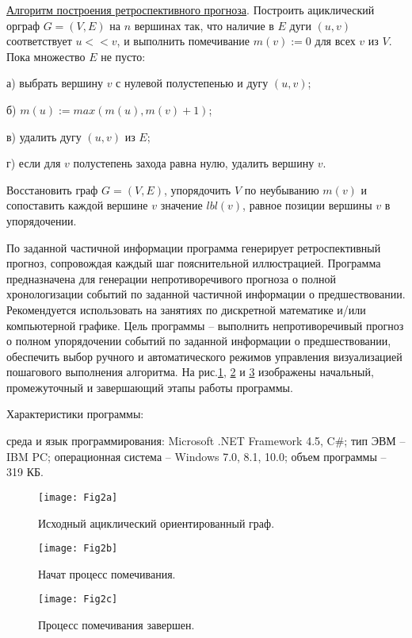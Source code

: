\underline{Алгоритм построения ретроспективного прогноза}. Построить ациклический орграф $G=(V,E)$ на $n$ вершинах так, что наличие в $E$ дуги $(u,v)$ соответствует $u<<v$, и выполнить помечивание $m(v):=0$ для всех $v$ из $V$. Пока множество
 $E$ не пусто:

а) выбрать вершину $v$ с нулевой полустепенью и дугу $(u,v)$;

б) $m(u):=max (m(u), m(v)+1)$;

в) удалить дугу $(u,v)$ из $E$;

г) если для $v$ полустепень захода равна нулю, удалить вершину $v$.

Восстановить граф $G=(V,E)$, упорядочить $V$ по неубыванию $m(v)$ и сопоставить каждой вершине $v$ значение $lbl(v)$, равное позиции вершины $v$ в упорядочении.

По заданной частичной информации программа генерирует ретроспективный прогноз, сопровождая каждый шаг пояснительной иллюстрацией.
Программа \cite{akm-prog2} предназначена для генерации непротиворечивого прогноза о полной хронологизации событий по заданной частичной информации о предшествовании. Рекомендуется использовать на занятиях по дискретной математике и/или компьютерной графике.
Цель программы – выполнить непротиворечивый прогноз о полном упорядочении событий по заданной информации о предшествовании, обеспечить выбор ручного и автоматического режимов управления визуализацией пошагового выполнения алгоритма. На рис.\ref{MAM_Fig2a}, \ref{MAM_Fig2b} и \ref{MAM_Fig2c} изображены начальный, промежуточный и завершающий этапы работы программы.

Характеристики программы:

среда и язык программирования: Microsoft .NET Framework 4.5, C\#;
тип ЭВМ – IBM PC;
операционная система – Windows 7.0, 8.1, 10.0;
объем программы – 319 КБ.

\begin{figure}[h]
  \texttt{[image: Fig2a]}
  \caption{Исходный ациклический ориентированный граф.}\label{MAM_Fig2a}
\end{figure}
\par\medskip
\begin{figure}[h]
  \texttt{[image: Fig2b]}
  \caption{Начат процесс помечивания.}\label{MAM_Fig2b}
\end{figure}
\par\medskip
\begin{figure}[h]
  \texttt{[image: Fig2c]}
  \caption{Процесс помечивания завершен.}\label{MAM_Fig2c}
\end{figure}
\par\medskip
